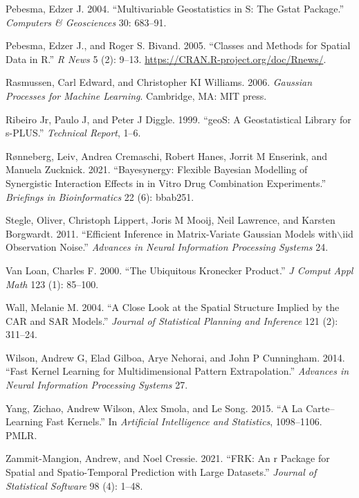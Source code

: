 \begin{CSLReferences}{1}{0}
\leavevmode{}%
Pebesma, Edzer J. 2004. {``Multivariable Geostatistics in {S}: The Gstat Package.''} \emph{Computers \& Geosciences} 30: 683--91.

\leavevmode{}%
Pebesma, Edzer J., and Roger S. Bivand. 2005. {``Classes and Methods for Spatial Data in {R}.''} \emph{R News} 5 (2): 9--13. \url{https://CRAN.R-project.org/doc/Rnews/}.

\leavevmode{}%
Rasmussen, Carl Edward, and Christopher KI Williams. 2006. \emph{Gaussian Processes for Machine Learning}. Cambridge, MA: MIT press.

\leavevmode{}%
Ribeiro Jr, Paulo J, and Peter J Diggle. 1999. {``geoS: A Geostatistical Library for s-PLUS.''} \emph{Technical Report}, 1--6.

\leavevmode{}%
Rønneberg, Leiv, Andrea Cremaschi, Robert Hanes, Jorrit M Enserink, and Manuela Zucknick. 2021. {``Bayesynergy: Flexible Bayesian Modelling of Synergistic Interaction Effects in in Vitro Drug Combination Experiments.''} \emph{Briefings in Bioinformatics} 22 (6): bbab251.

\leavevmode{}%
Stegle, Oliver, Christoph Lippert, Joris M Mooij, Neil Lawrence, and Karsten Borgwardt. 2011. {``Efficient Inference in Matrix-Variate Gaussian Models with\(\backslash\)iid Observation Noise.''} \emph{Advances in Neural Information Processing Systems} 24.

\leavevmode{}%
Van Loan, Charles F. 2000. {``The Ubiquitous {K}ronecker Product.''} \emph{J Comput Appl Math} 123 (1): 85--100.

\leavevmode{}%
Wall, Melanie M. 2004. {``A Close Look at the Spatial Structure Implied by the CAR and SAR Models.''} \emph{Journal of Statistical Planning and Inference} 121 (2): 311--24.

\leavevmode{}%
Wilson, Andrew G, Elad Gilboa, Arye Nehorai, and John P Cunningham. 2014. {``Fast Kernel Learning for Multidimensional Pattern Extrapolation.''} \emph{Advances in Neural Information Processing Systems} 27.

\leavevmode{}%
Yang, Zichao, Andrew Wilson, Alex Smola, and Le Song. 2015. {``A La Carte--Learning Fast Kernels.''} In \emph{Artificial Intelligence and Statistics}, 1098--1106. PMLR.

\leavevmode{}%
Zammit-Mangion, Andrew, and Noel Cressie. 2021. {``FRK: An r Package for Spatial and Spatio-Temporal Prediction with Large Datasets.''} \emph{Journal of Statistical Software} 98 (4): 1--48.

\end{CSLReferences}

